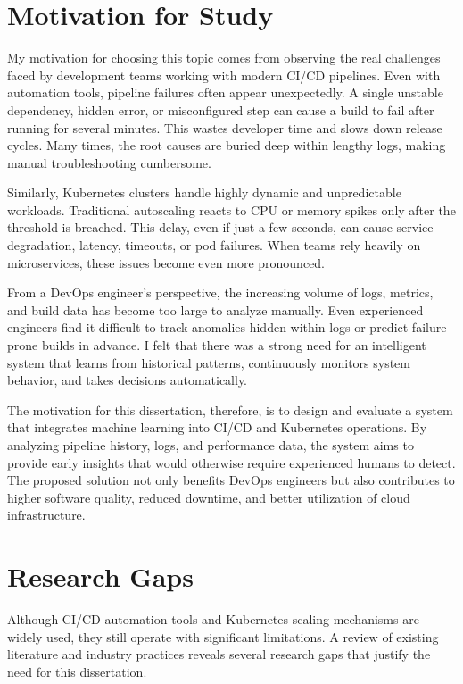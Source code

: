 \documentclass[12pt]{report}
\begin{document}
\section{Motivation for Study}

My motivation for choosing this topic comes from observing the real challenges faced by development teams working with modern CI/CD pipelines. Even with automation tools, pipeline failures often appear unexpectedly. A single unstable dependency, hidden error, or misconfigured step can cause a build to fail after running for several minutes. This wastes developer time and slows down release cycles. Many times, the root causes are buried deep within lengthy logs, making manual troubleshooting cumbersome.

Similarly, Kubernetes clusters handle highly dynamic and unpredictable workloads. Traditional autoscaling reacts to CPU or memory spikes only after the threshold is breached. This delay, even if just a few seconds, can cause service degradation, latency, timeouts, or pod failures. When teams rely heavily on microservices, these issues become even more pronounced.

From a DevOps engineer’s perspective, the increasing volume of logs, metrics, and build data has become too large to analyze manually. Even experienced engineers find it difficult to track anomalies hidden within logs or predict failure-prone builds in advance. I felt that there was a strong need for an intelligent system that learns from historical patterns, continuously monitors system behavior, and takes decisions automatically.

The motivation for this dissertation, therefore, is to design and evaluate a system that integrates machine learning into CI/CD and Kubernetes operations. By analyzing pipeline history, logs, and performance data, the system aims to provide early insights that would otherwise require experienced humans to detect. The proposed solution not only benefits DevOps engineers but also contributes to higher software quality, reduced downtime, and better utilization of cloud infrastructure.

\section{Research Gaps}

Although CI/CD automation tools and Kubernetes scaling mechanisms are widely used, they still operate with significant limitations. A review of existing literature and industry practices reveals several research gaps that justify the need for this dissertation.
\end{document}
